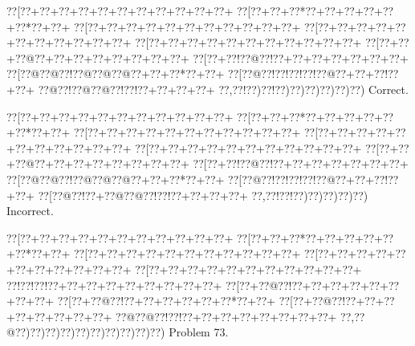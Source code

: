 \documentclass[a5paper]{article}
\begin{document}
\begin{center}
{\goo
\0??[\0??+\0??+\0??+\0??+\0??+\0??+\0??+\0??+\0??+\0??+\0??+
\0??[\0??+\0??+\0??*\0??+\0??+\0??+\0??+\0??+\0??*\0??+\0??+
\0??[\0??+\0??+\0??+\0??+\0??+\0??+\0??+\0??+\0??+\0??+\0??+
\0??[\0??+\0??+\0??+\0??+\0??+\0??+\0??+\0??+\0??+\0??+\0??+
\0??[\0??+\0??+\0??+\0??+\0??+\0??+\0??+\0??+\0??+\0??+\0??+
\0??[\0??+\0??+\0??@\0??+\0??+\0??+\0??+\0??+\0??+\0??+\0??+
\0??[\0??+\0??!\0??@\0??!\0??+\0??+\0??+\0??+\0??+\0??+\0??+
\0??[\0??@\0??@\0??!\0??@\0??@\0??@\0??+\0??+\0??*\0??+\0??+
\0??[\0??@\0??!\0??!\0??!\0??!\0??@\0??+\0??+\0??!\0??+\0??+
\0??@\0??!\0??@\0??@\0??!\0??!\0??+\0??+\0??+\0??+
\0??,\0??!\0??)\0??!\0??)\0??)\0??)\0??)\0??)\0??)
}
Correct. 

\end{center}
\begin{center}
{\goo
\0??[\0??+\0??+\0??+\0??+\0??+\0??+\0??+\0??+\0??+\0??+\0??+
\0??[\0??+\0??+\0??*\0??+\0??+\0??+\0??+\0??+\0??*\0??+\0??+
\0??[\0??+\0??+\0??+\0??+\0??+\0??+\0??+\0??+\0??+\0??+\0??+
\0??[\0??+\0??+\0??+\0??+\0??+\0??+\0??+\0??+\0??+\0??+\0??+
\0??[\0??+\0??+\0??+\0??+\0??+\0??+\0??+\0??+\0??+\0??+\0??+
\0??[\0??+\0??+\0??@\0??+\0??+\0??+\0??+\0??+\0??+\0??+\0??+
\0??[\0??+\0??!\0??@\0??!\0??+\0??+\0??+\0??+\0??+\0??+\0??+
\0??[\0??@\0??@\0??!\0??@\0??@\0??@\0??+\0??+\0??*\0??+\0??+
\0??[\0??@\0??!\0??!\0??!\0??!\0??@\0??+\0??+\0??!\0??+\0??+
\0??[\0??@\0??!\0??+\0??@\0??@\0??!\0??!\0??+\0??+\0??+\0??+
\0??,\0??!\0??!\0??)\0??)\0??)\0??)\0??)
}
Incorrect. 

\end{center}
\newpage
\begin{center}
{\goo
\0??[\0??+\0??+\0??+\0??+\0??+\0??+\0??+\0??+\0??+\0??+\0??+
\0??[\0??+\0??+\0??*\0??+\0??+\0??+\0??+\0??+\0??*\0??+\0??+
\0??[\0??+\0??+\0??+\0??+\0??+\0??+\0??+\0??+\0??+\0??+\0??+
\0??[\0??+\0??+\0??+\0??+\0??+\0??+\0??+\0??+\0??+\0??+\0??+
\0??[\0??+\0??+\0??+\0??+\0??+\0??+\0??+\0??+\0??+\0??+\0??+
\0??!\0??!\0??!\0??+\0??+\0??+\0??+\0??+\0??+\0??+\0??+\0??+
\0??[\0??+\0??@\0??!\0??+\0??+\0??+\0??+\0??+\0??+\0??+\0??+
\0??[\0??+\0??@\0??!\0??+\0??+\0??+\0??+\0??+\0??*\0??+\0??+
\0??[\0??+\0??@\0??!\0??+\0??+\0??+\0??+\0??+\0??+\0??+\0??+
\0??@\0??@\0??!\0??!\0??+\0??+\0??+\0??+\0??+\0??+\0??+\0??+
\0??,\0??@\0??)\0??)\0??)\0??)\0??)\0??)\0??)\0??)\0??)\0??)
}
Problem 73.

\end{center}
\end{document}
